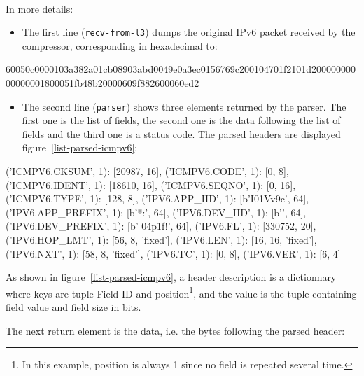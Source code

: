 ~~ 

In more details:
\begin{itemize}
    \item The first line (\texttt{recv-from-l3}) dumps the original IPv6 packet received by the compressor, corresponding in hexadecimal to:
\end{itemize}

\begin{termc}[backgroundcolor=\color{palerod}, basicstyle=\ttfamily\tiny, escapechar=@]
60050c0000103a382a01cb08903abd0049e0a3ec0156769c200104701f2101d20000000000000001800051fb48b20000609f882600060ed2
\end{termc}

\begin{itemize}
    \item The second line (\texttt{parser}) shows three elements returned by the parser. The first one is the list of fields, the second one is the data following the list of fields and the third one is a status code. The parsed headers are displayed figure~\ref{list-parsed-icmpv6}:
\end{itemize}

\begin{termc}[backgroundcolor=\color{palerod}, basicstyle=\ttfamily\small, escapechar=@, label=list-parsed-icmpv6, caption={Parsed IPv6/ICMPv6 header fields}]
{('ICMPV6.CKSUM', 1): [20987, 16],
 ('ICMPV6.CODE', 1): [0, 8],
 ('ICMPV6.IDENT', 1): [18610, 16],
 ('ICMPV6.SEQNO', 1): [0, 16],
 ('ICMPV6.TYPE', 1): [128, 8],
 ('IPV6.APP_IID', 1): [b'I\xec\x01Vv\x9c', 64],
 ('IPV6.APP_PREFIX', 1): [b'*\xcb{}:\xbd{}', 64],
 ('IPV6.DEV_IID', 1): [b'', 64],
 ('IPV6.DEV_PREFIX', 1): [b' \x04p\x1f!', 64],
 ('IPV6.FL', 1): [330752, 20],
 ('IPV6.HOP_LMT', 1): [56, 8, 'fixed'],
 ('IPV6.LEN', 1): [16, 16, 'fixed'],
 ('IPV6.NXT', 1): [58, 8, 'fixed'],
 ('IPV6.TC', 1): [0, 8],
 ('IPV6.VER', 1): [6, 4]}
\end{termc}
\begin{itemize}

As shown in figure~\vref{list-parsed-icmpv6}, a header description is a dictionnary where keys are tuple Field ID and position\footnote{In this example, position is always 1 since no field is repeated several time.}, and the value is the tuple containing field value and field size in bits.
\end{itemize}

\begin{itemize}
 The next return element is the data, i.e. the bytes following the parsed header:
\end{itemize}

